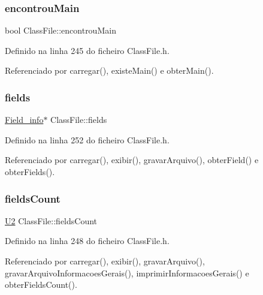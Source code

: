 \subsubsection{\texorpdfstring{encontrou\+Main}{encontrouMain}}
{\footnotesize\ttfamily bool Class\+File\+::encontrou\+Main\hspace{0.3cm}{\ttfamily [private]}}



Definido na linha 245 do ficheiro Class\+File.\+h.



Referenciado por carregar(), existe\+Main() e obter\+Main().

\mbox{\label{classClassFile_a6d6ec8aa668982ea722edc40b3ea5b1a}} 
\subsubsection{\texorpdfstring{fields}{fields}}
{\footnotesize\ttfamily \hyperlink{structField__info}{Field\+\_\+info}$\ast$ Class\+File\+::fields\hspace{0.3cm}{\ttfamily [private]}}



Definido na linha 252 do ficheiro Class\+File.\+h.



Referenciado por carregar(), exibir(), gravar\+Arquivo(), obter\+Field() e obter\+Fields().

\mbox{\label{classClassFile_a5eae2e906695e596b89614df0e4b060a}} 
\subsubsection{\texorpdfstring{fields\+Count}{fieldsCount}}
{\footnotesize\ttfamily \hyperlink{BasicTypes_8h_a90240657108b1b457eef9d3f76e0202e}{U2} Class\+File\+::fields\+Count\hspace{0.3cm}{\ttfamily [private]}}



Definido na linha 248 do ficheiro Class\+File.\+h.



Referenciado por carregar(), exibir(), gravar\+Arquivo(), gravar\+Arquivo\+Informacoes\+Gerais(), imprimir\+Informacoes\+Gerais() e obter\+Fields\+Count().

